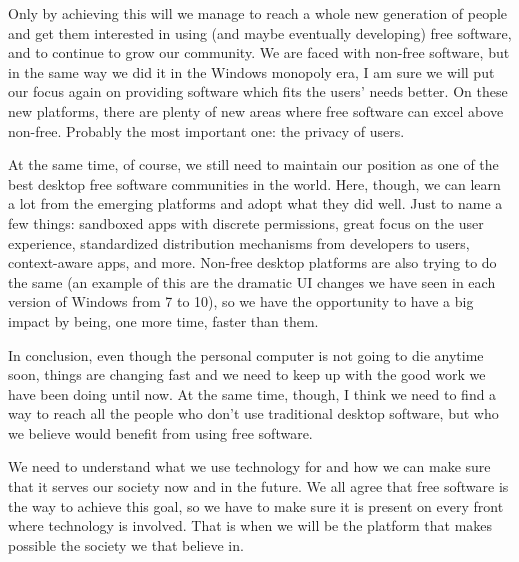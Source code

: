 Only by achieving this will we manage to reach a whole new generation of people and get them interested in using (and maybe eventually developing) free software, and to continue to grow our community. We are faced with non-free software, but in the same way we did it in the Windows monopoly era, I am sure we will put our focus again on providing software which fits the users’ needs better. On these new platforms, there are plenty of new areas where free software can excel above non-free. Probably the most important one: the privacy of users.

At the same time, of course, we still need to maintain our position as one of the best desktop free software communities in the world. Here, though, we can learn a lot from the emerging platforms and adopt what they did well. Just to name a few things: sandboxed apps with discrete permissions, great focus on the user experience, standardized distribution mechanisms from developers to users, context-aware apps, and more. Non-free desktop platforms are also trying to do the same (an example of this are the dramatic UI changes we have seen in each version of Windows from 7 to 10), so we have the opportunity to have a big impact by being, one more time, faster than them.

In conclusion, even though the personal computer is not going to die anytime soon, things are changing fast and we need to keep up with the good work we have been doing until now. At the same time, though, I think we need to find a way to reach all the people who don't use traditional desktop software, but who we believe would benefit from using free software.

We need to understand what we use technology for and how we can make sure that it serves our society now and in the future. We all agree that free software is the way to achieve this goal, so we have to make sure it is present on every front where technology is involved. That is when we will be the platform that makes possible the society we that believe in.
